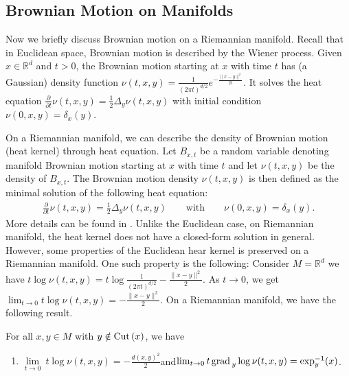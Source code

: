 \subsection{Brownian Motion on Manifolds}

Now we briefly discuss Brownian motion on a Riemannian manifold. Recall that in Euclidean space, Brownian motion is described by the Wiener process. Given $x \in \mathbb{R}^{d}$ and $t > 0$, the Brownian motion starting at $x$ with time $t$ has (a Gaussian) density function 
$\nu(t, x, y) = \frac{1}{(2\pi t)^{d/2}}e^{-\frac{\|x - y\|^{2}}{2t}}$.
It solves the heat equation $\frac{\partial}{\partial t} \nu(t, x, y) = \frac{1}{2} \Delta_{y} \nu(t, x, y)$ 
with initial condition $\nu(0, x, y) = \delta_{x}(y)$. 

On a Riemannian manifold, we can describe the density of Brownian motion (heat kernel) through heat equation.
Let $B_{x, t}$ be a random variable denoting manifold Brownian motion starting at $x$ with time $t$ 
and let $\nu(t, x, y)$ be the density of $B_{x, t}$.
The Brownian motion density $\nu(t, x, y)$ is then defined as the minimal solution of the following heat equation:
\begin{equation*}
    \begin{split}
        \frac{\partial}{\partial t} \nu(t, x, y) = \frac{1}{2} \Delta_{y} \nu(t, x, y) \qquad\text{with}\qquad
        \nu(0, x, y) = \delta_{x}(y).
    \end{split}
\end{equation*}
More details can be found in \citet[Chapter 4]{hsu2002stochastic}.
Unlike the Euclidean case, on Riemannian manifold, the heat kernel does not have a closed-form solution in general. However, some properties of the Euclidean hear kernel is preserved on a Riemannian manifold. One such property is the following: 
Consider $M = \mathbb{R}^{d}$ we have $t \log \nu(t, x, y) = t \log \frac{1}{(2\pi t)^{d/2}} - \frac{\|x - y\|^{2}}{2}$. 
As $t \to 0$, we get $\lim_{t \to 0} t \log \nu(t, x, y) = - \frac{\|x - y\|^{2}}{2}$.
On a Riemannian manifold, we have the following result.
\begin{fact}
    For all $x, y \in M$ with $y \notin \operatorname{Cut\,}(x)$, we have 
    \begin{enumerate}
        \item[] $\underset{t \to 0}{\lim}~t \log \nu(t, x, y) = - \frac{d(x, y)^{2}}{2}$\quad and\quad$\lim_{t \to 0} t \operatorname{grad\,}_{y} \log \nu(t, x, y) = \exp_{y}^{-1}(x)$.
    \end{enumerate}
\end{fact}
